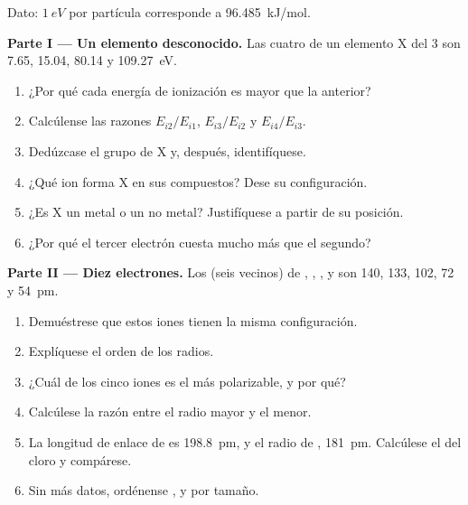 \begin{problem}
\label{pb:b1:periodicity:1}
Dato: $\qty{1}{eV}$ por partícula corresponde a \qty{96.485}{kJ/mol}.

\medskip
\noindent\textbf{Parte I --- Un elemento desconocido.}
Las cuatro  de un elemento X del  3
son 7.65, 15.04, 80.14 y \qty{109.27}{eV}.
\begin{enumerate}
  \item ¿Por qué cada energía de ionización es mayor que la anterior?
  \item Calcúlense las razones $E_{i2}/E_{i1}$, $E_{i3}/E_{i2}$ y
        $E_{i4}/E_{i3}$.
  \item Dedúzcase el grupo de X y, después, identifíquese.
  \item ¿Qué ion forma X en sus compuestos? Dese su configuración.
  \item ¿Es X un metal o un no metal? Justifíquese a partir de su posición.
  \item ¿Por qué el tercer electrón cuesta mucho más que el segundo?
\end{enumerate}

\medskip
\noindent\textbf{Parte II --- Diez electrones.}
Los  (seis vecinos) de , , ,
 y  son 140, 133, 102, 72 y \qty{54}{pm}.
\begin{enumerate}[resume]
  \item Demuéstrese que estos iones tienen la misma configuración.
  \item Explíquese el orden de los radios.
  \item ¿Cuál de los cinco iones es el más polarizable, y por qué?
  \item Calcúlese la razón entre el radio mayor y el menor.
  \item La longitud de enlace de  es \qty{198.8}{pm}, y el radio
        de , \qty{181}{pm}. Calcúlese el  del cloro
        y compárese.
  \item Sin más datos, ordénense ,  y  por
        tamaño.
\end{enumerate}


\end{problem}

